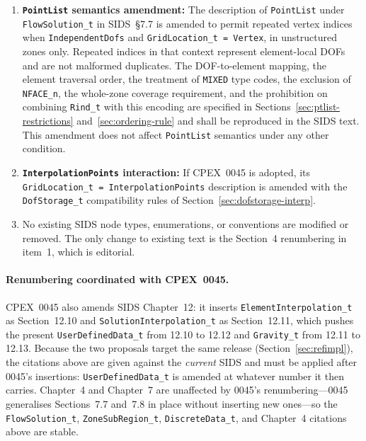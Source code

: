 \documentclass[11pt,letterpaper]{article}
\begin{document}
\begin{enumerate}[leftmargin=2em]
\item \textbf{\texttt{PointList} semantics amendment:} The description of
  \texttt{PointList} under \texttt{FlowSolution\_t} in SIDS~\S7.7 is
  amended to permit repeated vertex indices when
  \texttt{IndependentDofs} and
  \texttt{GridLocation\_t = Vertex}, in unstructured zones only.
  Repeated indices in that context represent element-local DOFs and are
  not malformed duplicates.  The DOF-to-element mapping, the element
  traversal order, the treatment of \texttt{MIXED} type codes, the
  exclusion of \texttt{NFACE\_n}, the whole-zone coverage requirement,
  and the prohibition on combining \texttt{Rind\_t} with this encoding
  are specified in Sections~\ref{sec:ptlist-restrictions}
  and~\ref{sec:ordering-rule} and shall be reproduced in the SIDS text.
  This amendment does not affect \texttt{PointList}
  semantics under any other condition.

\item \textbf{\texttt{InterpolationPoints} interaction:} If CPEX~0045 is
  adopted, its \texttt{GridLocation\_t = InterpolationPoints}
  description is amended with the \texttt{DofStorage\_t}
  compatibility rules of Section~\ref{sec:dofstorage-interp}.

\item No existing SIDS node types, enumerations, or conventions are
  modified or removed.  The only change to existing text is the
  Section~4 renumbering in item~1, which is editorial.
\end{enumerate}

\paragraph{Renumbering coordinated with CPEX~0045.}  CPEX~0045 also
amends SIDS Chapter~12: it inserts \texttt{ElementInterpolation\_t} as
Section~12.10 and \texttt{SolutionInterpolation\_t} as Section~12.11,
which pushes the present \texttt{UserDefinedData\_t} from 12.10 to 12.12
and \texttt{Gravity\_t} from 12.11 to 12.13.  Because the two proposals
target the same release
(Section~\ref{sec:refimpl}), the citations above are given against the
\emph{current} SIDS and must be applied after 0045's insertions:
\texttt{UserDefinedData\_t} is amended at whatever number it then
carries.  Chapter~4 and Chapter~7 are unaffected by 0045's
renumbering---0045 generalises Sections~7.7 and~7.8 in place without
inserting new ones---so the \texttt{FlowSolution\_t},
\texttt{ZoneSubRegion\_t}, \texttt{DiscreteData\_t}, and
Chapter~4 citations above are stable.
\end{document}
